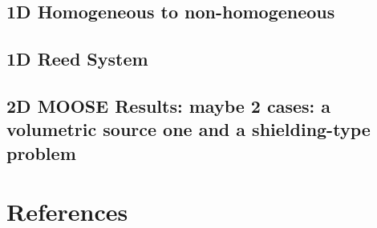 \documentclass[review]{elsarticle}
\begin{document}
\subsection{1D Homogeneous to non-homogeneous}

\subsection{1D Reed System}

\subsection{2D MOOSE Results: maybe 2 cases: a volumetric source one and a shielding-type problem}


\section*{References}



\end{document}
